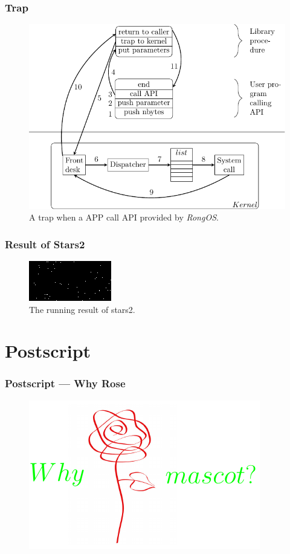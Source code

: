 \documentclass{beamer}
\begin{document}
\begin{frame}
  \frametitle{Trap}
  \begin{figure}
    \includegraphics[scale=.8]{../thesis/figs/call-graphic.pdf}
    \caption{A trap when a APP call API provided by \emph{RongOS}.}
  \end{figure}
\end{frame}



\begin{frame}
  \frametitle{Result of Stars2}
  \begin{figure}
    \includegraphics[scale=2.4]{../thesis/figs/starts2.png}
    \caption{The running result of stars2.}
  \end{figure}
\end{frame}

\section{Postscript}

\begin{frame}
  \frametitle{Postscript — Why Rose}
  \begin{figure}
    \includegraphics[scale=1.8]{whyRose.pdf}
  \end{figure}
  
\end{frame}
\end{document}
